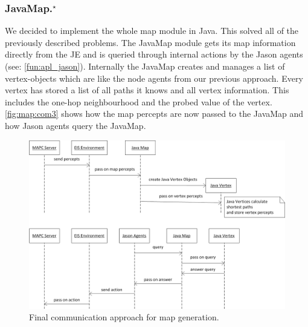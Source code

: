 \subsubsection[JavaMap]{JavaMap.$^\star$}\label{alg:map_javamap}
We decided to implement the whole map module in Java.
This solved all of the previously described problems.
The JavaMap module gets its map information directly from the JE and is queried through internal actions by the Jason agents (see: \autoref{fun:apl_jason}).
Internally the JavaMap creates and manages a list of vertex-objects which are like the node agents from our previous approach.
Every vertex has stored a list of all paths it knows and all vertex information.
This includes the one-hop neighbourhood and the probed value of the vertex.
\autoref{fig:map:com3} shows how the map percepts are now passed to the JavaMap and how Jason agents query the JavaMap.
\begin{figure}
  \centering
  \includegraphics[width=\linewidth]{images/map_com_3.png}
  \caption{Final communication approach for map generation.}
  \label{fig:map:com3}
\end{figure}

